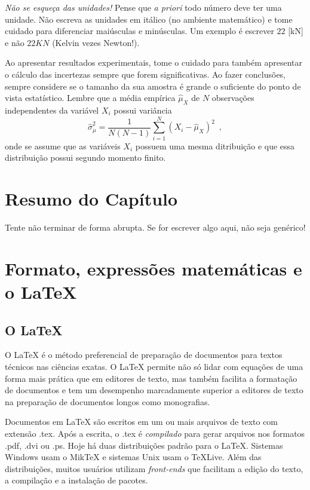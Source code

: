 \emph{Não se esqueça das unidades!} Pense que \emph{a priori} todo número deve ter uma unidade. Não escreva as unidades em itálico (no ambiente matemático) e tome cuidado para diferenciar maiúsculas e minúsculas. Um exemplo é escrever $22$ [kN] e não $22 KN$ (Kelvin vezes Newton!).

Ao apresentar resultados experimentais, tome o cuidado para também apresentar o cálculo das incertezas sempre que forem significativas. Ao fazer conclusões, sempre considere se o tamanho da sua amostra é grande o suficiente do ponto de vista estatístico. Lembre que a média empírica $\hat{\mu}_X$ de $N$ observações independentes da variável $X_i$ possui variância
\[
\hat{\sigma}_{\mu}^2 = \frac{1}{N(N-1)} \sum_{i=1}^N (X_i-\hat{\mu}_X)^2
\enspace,
\]
onde se assume que as variáveis $X_i$ possuem uma mesma ditribuição e que essa distribuição possui segundo momento finito.


\section{Resumo do Capítulo}
\label{sec:resumoo4}
Tente não terminar de forma abrupta. Se for escrever algo aqui, não seja genérico!

\section{Formato, expressões matemáticas e o \LaTeX}

\subsection{O \LaTeX}

O {\LaTeX}  é o método preferencial de preparação de documentos para textos técnicos nas ciências exatas. O {\LaTeX} permite não só lidar com equações de uma forma mais prática que em editores de texto, mas também facilita a formatação de documentos e tem um desempenho marcadamente superior a editores de texto na preparação de documentos longos como monografias. 

Documentos em {\LaTeX} são escritos em um ou mais arquivos de texto com extensão .tex. Após a escrita, o .tex é \emph{compilado} para gerar arquivos nos formatos .pdf, .dvi ou .ps. Hoje há duas distribuições padrão para o \LaTeX. Sistemas Windows usam o {Mik\TeX} e sistemas Unix usam o \TeX Live. Além das distribuições, muitos usuários utilizam \emph{front-ends} que facilitam a edição do texto, a compilação e a instalação de pacotes. 

